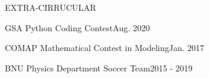 \documentclass{resume} %
\begin{document}
\begin{rSection}{EXTRA-CIRRUCULAR}
    
    \begin{qSubsection}
        {GSA Python Coding Contest}{Aug. 2020}
    \end{qSubsection}

    \begin{qSubsection}
        {COMAP Mathematical Contest in Modeling}{Jan. 2017}
    \end{qSubsection}

    \begin{qSubsection}
        {BNU Physics Department Soccer Team}{2015 - 2019}
    \end{qSubsection}
\end{rSection}

 
\end{document}
